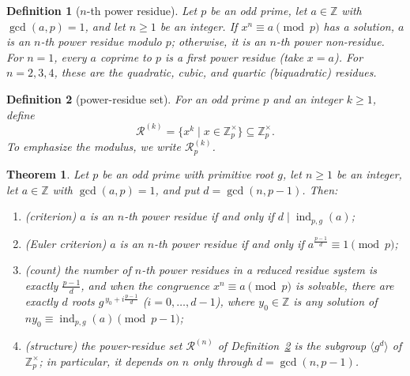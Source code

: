 \documentclass[11pt]{article}
\theoremstyle{ntstyle}
\newtheorem{theorem}{Theorem}[subsection]
\newtheorem{definition}{Definition}[subsection]
\newcommand{\ZmodUnits}[1]{\mathbb{Z}_{#1}^{\times}}
\DeclareMathOperator{\ind}{ind}
\begin{document}
\begin{definition}[$n$-th power residue]\label{def:7.7.1}
	Let $p$ be an odd prime, let $a\in\mathbb{Z}$ with $\gcd(a, p) = 1$, and let $n \ge 1$ be an
	integer. If $x^{n} \equiv a
		\pmod{p}$ has a solution, $a$ is an $n$-th power residue modulo $p$;
	otherwise, it is an $n$-th power non-residue. For $n = 1$, every $a$ coprime to $p$ is a
	first power residue (take $x = a$). For $n = 2, 3, 4$, these are
	the quadratic, cubic, and quartic (biquadratic) residues.
\end{definition}
\begin{definition}[power-residue set]\label{def:7.7.2} For an odd
	prime $p$ and an integer $k\ge1$, define
	\[
		\mathcal{R}^{(k)}=\{x^k \mid x\in\ZmodUnits{p}\}
		\subseteq\ZmodUnits{p}.
	\]
	To emphasize the modulus, we write $\mathcal{R}_p^{(k)}$.
\end{definition}
\begin{theorem}\label{thm:7.7.1} Let $p$ be an odd
	prime with primitive root $g$, let $n\ge1$ be an integer, let $a\in\mathbb{Z}$ with $\gcd(a, p) =
	1$, and put $d = \gcd(n, p-1)$. Then:

	\begin{enumerate}[label={\alph*)}]
		\item (criterion) $a$ is an $n$-th power residue if and only if $d \mid
						\ind_{p,g}(a)$;
		\item (Euler criterion) $a$ is an $n$-th power residue if and only if
						$a^{\frac{p-1}{d}} \equiv 1 \pmod{p}$;
		\item (count) the number of $n$-th power residues in a reduced residue system is exactly
					$\frac{p-1}{d}$, and when the congruence $x^{n} \equiv a \pmod{p}$ is solvable, there are
					exactly $d$ roots $g^{\,y_0 + i\frac{p-1}{d}}$ ($i = 0, \ldots, d-1$),
					where $y_0\in\mathbb{Z}$ is any solution of
					$ny_0\equiv\ind_{p,g}(a)\pmod{p-1}$;
		\item (structure) the power-residue set $\mathcal{R}^{(n)}$ of
					Definition~\ref{def:7.7.2} is the subgroup $\langle g^{d}\rangle$ of
					$\ZmodUnits{p}$; in
					particular, it depends on $n$ only through $d=\gcd(n,p-1)$.
	\end{enumerate}
\end{theorem}
\end{document}

